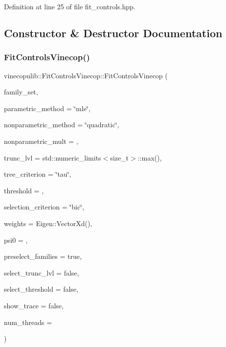 Definition at line 25 of file fit\+\_\+controls.\+hpp.



\subsection{Constructor \& Destructor Documentation}
\mbox{\label{classvinecopulib_1_1_fit_controls_vinecop_a94112587de376b493be4445aab15b7ce}} 
\subsubsection{\texorpdfstring{Fit\+Controls\+Vinecop()}{FitControlsVinecop()}\hspace{0.1cm}{\footnotesize\ttfamily [1/2]}}
{\footnotesize\ttfamily vinecopulib\+::\+Fit\+Controls\+Vinecop\+::\+Fit\+Controls\+Vinecop (\begin{DoxyParamCaption}\item[{std\+::vector$<$ \hyperlink{namespacevinecopulib_a42e95cc06d33896199caab0c11ad44f3}{Bicop\+Family} $>$}]{family\+\_\+set,  }\item[{std\+::string}]{parametric\+\_\+method = {\ttfamily \char`\"{}mle\char`\"{}},  }\item[{std\+::string}]{nonparametric\+\_\+method = {\ttfamily \char`\"{}quadratic\char`\"{}},  }\item[{double}]{nonparametric\+\_\+mult = {},  }\item[{size\+\_\+t}]{trunc\+\_\+lvl = {\ttfamily std\+:\+:numeric\+\_\+limits$<$size\+\_\+t$>$\+:\+:max()},  }\item[{std\+::string}]{tree\+\_\+criterion = {\ttfamily \char`\"{}tau\char`\"{}},  }\item[{double}]{threshold = {},  }\item[{std\+::string}]{selection\+\_\+criterion = {\ttfamily \char`\"{}bic\char`\"{}},  }\item[{const Eigen\+::\+Vector\+Xd \&}]{weights = {\ttfamily Eigen\+:\+:VectorXd()},  }\item[{double}]{psi0 = {},  }\item[{bool}]{preselect\+\_\+families = {\ttfamily true},  }\item[{bool}]{select\+\_\+trunc\+\_\+lvl = {\ttfamily false},  }\item[{bool}]{select\+\_\+threshold = {\ttfamily false},  }\item[{bool}]{show\+\_\+trace = {\ttfamily false},  }\item[{size\+\_\+t}]{num\+\_\+threads = {} }\end{DoxyParamCaption})\hspace{0.3cm}{\ttfamily [inline]}}



